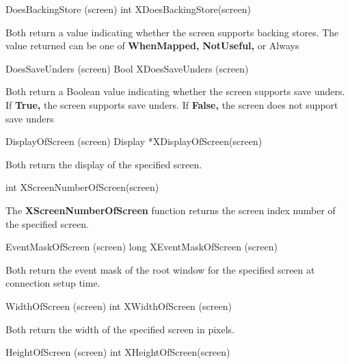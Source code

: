 \documentclass{report}
\begin{document}
\begin{itemize}
            \bigbreak \noindent 
            \begin{cppcode}
                DoesBackingStore (screen)
                int XDoesBackingStore(screen)
            \end{cppcode}
            \bigbreak \noindent 
            Both return a value indicating whether the screen supports backing stores. The value returned can be one of \textbf{WhenMapped,} \textbf{NotUseful,} or Always 
            \bigbreak \noindent 
            \begin{cppcode}
                DoesSaveUnders (screen)
                Bool XDoesSaveUnders (screen)
            \end{cppcode}
            \bigbreak \noindent 
            Both return a Boolean value indicating whether the screen supports save unders. If \textbf{True,} the screen supports save unders. If \textbf{False,} the screen does not support save unders 
            \bigbreak \noindent 
            \begin{cppcode}
                DisplayOfScreen (screen)
                Display *XDisplayOfScreen(screen)
            \end{cppcode}
            \bigbreak \noindent 
            Both return the display of the specified screen.
            \bigbreak \noindent 
            \begin{cppcode}
                int XScreenNumberOfScreen(screen)
            \end{cppcode}
            \bigbreak \noindent 
            The \textbf{XScreenNumberOfScreen} function returns the screen index number of the specified screen.
            \bigbreak \noindent 
            \begin{cppcode}
                EventMaskOfScreen (screen)
                long XEventMaskOfScreen (screen)
            \end{cppcode}
            \bigbreak \noindent 
            Both return the event mask of the root window for the specified screen at connection setup time.
            \bigbreak \noindent 
            \begin{cppcode}
                WidthOfScreen (screen)
                int XWidthOfScreen (screen)
            \end{cppcode}
            \bigbreak \noindent 
            Both return the width of the specified screen in pixels.
            \bigbreak \noindent 
            \begin{cppcode}
                HeightOfScreen (screen)
                int XHeightOfScreen(screen)

\end{cppcode}
\end{itemize}
\end{document}
